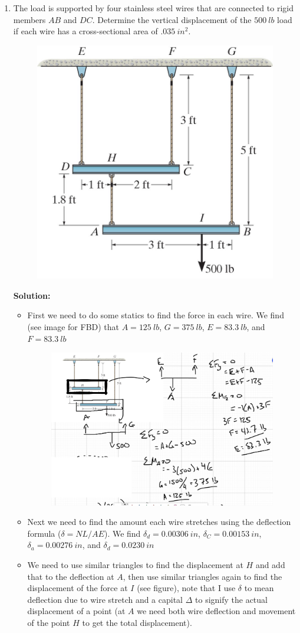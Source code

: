 \documentclass[12pt, oneside]{article}
\let\US\SI
\begin{document}
\begin{enumerate}
	\item %
		The load is supported by four stainless steel wires that are connected to rigid members $AB$ and $DC$.
		Determine the vertical displacement of the $\US{500}{lb}$ load if each wire has a cross-sectional area of $\US{.035}{in^2}$.
		\begin{figure}[H]
			\centering
			\includegraphics[width=0.5\linewidth]{4-11}
		\end{figure}
		\textbf{Solution:}
		\begin{itemize}
		\item First we need to do some statics to find the force in each wire.
			We find (see image for FBD) that $A=\US{125}{lb}$, $G=\US{375}{lb}$, $E=\US{83.3}{lb}$, and $F=\US{83.3}{lb}$
			\begin{figure}[H]
				\centering
				\includegraphics[width=0.7\linewidth]{2a}
			\end{figure}
		\item Next we need to find the amount each wire stretches using the deflection formula ($\delta = NL/AE$).
			We find $\delta_d = \US{0.00306}{in}$, $\delta_C = \US{0.00153}{in}$, $\delta_a = \US{0.00276}{in}$, and $\delta_d = \US{0.0230}{in}$
		\item We need to use similar triangles to find the displacement at $H$ and add that to the deflection at $A$, then use similar triangles again to find the displacement of the force at $I$ (see figure), note that I use $\delta$ to mean deflection due to wire stretch and a capital $\Delta$ to signify the actual displacement of a point (at $A$ we need both wire deflection and movement of the point $H$ to get the total displacement).

\end{itemize}
\end{enumerate}
\end{document}
